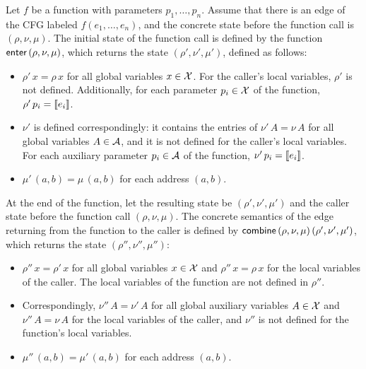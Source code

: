Let $f$ be a function with parameters $p_1, \ldots, p_n$.
Assume that there is an edge of the CFG labeled $f(e_1, \ldots, e_n)$,
and the concrete state before the function call is $(\rho, \nu, \mu)$.
The initial state of the function call is defined by the function $\textsf{enter}\,(\rho, \nu, \mu)$, which returns the state $(\rho', \nu', \mu')$, defined as follows:
\begin{itemize}
    \item $\rho'\,x = \rho\,x$ for all global variables $x \in \mathcal{X}$.
          For the caller's local variables, $\rho'$ is not defined.
          Additionally, for each parameter $p_i \in \mathcal{X}$ of the function, $\rho'\,p_i = \llbracket e_i\rrbracket$.
    \item $\nu'$ is defined correspondingly: it contains the entries of $\nu'\,A = \nu\,A$ for all global variables $A \in \mathcal{A}$, and it is not defined for the caller's local variables.
          For each auxiliary parameter $p_i \in \mathcal{A}$ of the function, $\nu'\,p_i=\llbracket e_i\rrbracket$.
    \item $\mu'\,(a,b)=\mu\,(a,b)$ for each address $(a,b)$.
\end{itemize}

At the end of the function, let the resulting state be $(\rho', \nu', \mu')$ and the caller state before the function call  $(\rho, \nu, \mu)$.
The concrete semantics of the edge returning from the function to the caller is defined by $\textsf{combine}\,(\rho, \nu, \mu)\,(\rho', \nu', \mu')$, which returns the state $(\rho'', \nu'', \mu'')$:
\begin{itemize}
    \item $\rho''\,x = \rho'\,x$ for all global variables $x \in \mathcal{X}$ and $\rho''\,x = \rho\,x$ for the local variables of the caller.
          The local variables of the function are not defined in $\rho''$.
    \item Correspondingly, $\nu''\,A = \nu'\,A$ for all global auxiliary variables $A \in \mathcal{X}$ and $\nu''\,A = \nu\,A$ for the local variables of the caller, and $\nu''$ is not defined for the function's local variables.
    \item $\mu''\,(a,b)=\mu'\,(a,b)$ for each address $(a,b)$.
\end{itemize}
